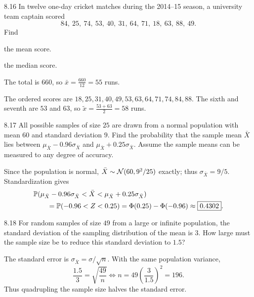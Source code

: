 \documentclass[11pt,oneside]{article}
\begin{document}
\begin{exercise}{8.16}
In twelve one-day cricket matches during the 2014--15 season, a university team captain scored
\[
84, \ 25, \ 74, \ 53, \ 40, \ 31, \ 64, \ 71, \ 18, \ 63, \ 88, \ 49.
\]
Find
\begin{exercisesubparts}
\item the mean score.
\item the median score.
\end{exercisesubparts}
\end{exercise}
\begin{solution}
\begin{exercisesubparts}
\item The total is $660$, so $\displaystyle\bar x=\frac{660}{12}=\boxed{55}$ runs.
\item The ordered scores are $18, 25, 31, 40, 49, 53, 63, 64, 71, 74, 84, 88$. The sixth and seventh are $53$ and $63$, so $\displaystyle\tilde x=\frac{53+63}{2}=\boxed{58}$ runs.
\end{exercisesubparts}
\end{solution}

\begin{exercise}{8.17}
All possible samples of size $25$ are drawn from a normal population with mean $60$ and standard deviation $9$. Find the probability that the sample mean $\bar X$ lies between $\mu_{\bar X}-0.96\sigma_{\bar X}$ and $\mu_{\bar X}+0.25\sigma_{\bar X}$. Assume the sample means can be measured to any degree of accuracy.
\end{exercise}
\begin{solution}
Since the population is normal, $\bar X\sim\mathcal{N}(60, 9^2/25)$ exactly; thus $\sigma_{\bar X}=9/5$. Standardization gives
\[
\begin{aligned}
&\mathbb{P}(\mu_{\bar X}-0.96\sigma_{\bar X}<\bar X<\mu_{\bar X}+0.25\sigma_{\bar X})\\
&\qquad=\mathbb{P}(-0.96<Z<0.25)
=\Phi(0.25)-\Phi(-0.96)
\approx\boxed{0.4302}.
\end{aligned}
\]
\end{solution}

\begin{exercise}{8.18}
For random samples of size $49$ from a large or infinite population, the standard deviation of the sampling distribution of the mean is $3$. How large must the sample size be to reduce this standard deviation to $1.5$?
\end{exercise}
\begin{solution}
The standard error is $\sigma_{\bar X}=\sigma/\sqrt n$. With the same population variance,
\[
\frac{1.5}{3}=\sqrt{\frac{49}{n}}
\iff n=49\left(\frac3{1.5}\right)^2
=\boxed{196}.
\]
Thus quadrupling the sample size halves the standard error.
\end{solution}
\end{document}
